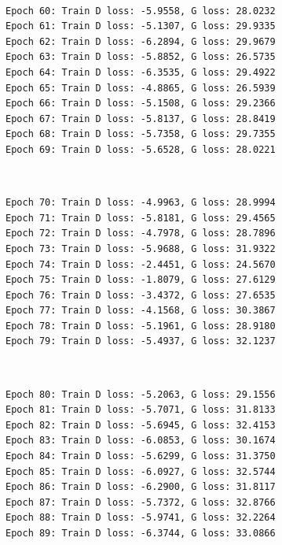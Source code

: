 \documentclass[11pt]{article}
\begin{document}
    \begin{center}
    \end{center}
    { \hspace*{\fill} \\}
    
    \begin{Verbatim}[commandchars=\\\{\}]
Epoch 60: Train D loss: -5.9558, G loss: 28.0232
Epoch 61: Train D loss: -5.1307, G loss: 29.9335
Epoch 62: Train D loss: -6.2894, G loss: 29.9679
Epoch 63: Train D loss: -5.8852, G loss: 26.5735
Epoch 64: Train D loss: -6.3535, G loss: 29.4922
Epoch 65: Train D loss: -4.8865, G loss: 26.5939
Epoch 66: Train D loss: -5.1508, G loss: 29.2366
Epoch 67: Train D loss: -5.8137, G loss: 28.8419
Epoch 68: Train D loss: -5.7358, G loss: 29.7355
Epoch 69: Train D loss: -5.6528, G loss: 28.0221

    \end{Verbatim}

    \begin{center}
    \end{center}
    { \hspace*{\fill} \\}
    
    \begin{Verbatim}[commandchars=\\\{\}]
Epoch 70: Train D loss: -4.9963, G loss: 28.9994
Epoch 71: Train D loss: -5.8181, G loss: 29.4565
Epoch 72: Train D loss: -4.7978, G loss: 28.7896
Epoch 73: Train D loss: -5.9688, G loss: 31.9322
Epoch 74: Train D loss: -2.4451, G loss: 24.5670
Epoch 75: Train D loss: -1.8079, G loss: 27.6129
Epoch 76: Train D loss: -3.4372, G loss: 27.6535
Epoch 77: Train D loss: -4.1568, G loss: 30.3867
Epoch 78: Train D loss: -5.1961, G loss: 28.9180
Epoch 79: Train D loss: -5.4937, G loss: 32.1237

    \end{Verbatim}

    \begin{center}
    \end{center}
    { \hspace*{\fill} \\}
    
    \begin{Verbatim}[commandchars=\\\{\}]
Epoch 80: Train D loss: -5.2063, G loss: 29.1556
Epoch 81: Train D loss: -5.7071, G loss: 31.8133
Epoch 82: Train D loss: -5.6945, G loss: 32.4153
Epoch 83: Train D loss: -6.0853, G loss: 30.1674
Epoch 84: Train D loss: -5.6299, G loss: 31.3750
Epoch 85: Train D loss: -6.0927, G loss: 32.5744
Epoch 86: Train D loss: -6.2900, G loss: 31.8117
Epoch 87: Train D loss: -5.7372, G loss: 32.8766
Epoch 88: Train D loss: -5.9741, G loss: 32.2264
Epoch 89: Train D loss: -6.3744, G loss: 33.0866

    \end{Verbatim}
\end{document}
